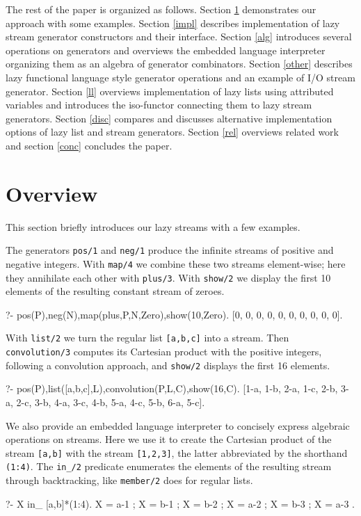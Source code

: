 \documentclass[submission,copyright,creativecommons]{eptcs}
\begin{document}
The rest of the paper is organized as follows.
Section \ref{ov} demonstrates our approach with some examples.
Section \ref{impl} describes implementation of lazy stream generator constructors and 
their  interface.
Section \ref{alg} introduces several operations on generators and overviews the
embedded language interpreter organizing them as an algebra of generator combinators.
Section \ref{other} describes lazy functional language style generator operations
and an example of I/O stream generator.
Section \ref{ll} overviews implementation of lazy lists using attributed variables
and introduces the iso-functor connecting them to  lazy stream generators.
Section \ref{disc} compares and discusses alternative implementation options of lazy list and stream generators.
Section \ref{rel} overviews related work and
section \ref{conc} concludes the paper. 

\section{Overview}\label{ov}

This section briefly introduces our lazy streams  with a few examples.

The generators {\tt pos/1} and {\tt neg/1} produce the infinite streams of positive
and negative integers. With {\tt map/4} we combine these two streams element-wise;
here they annihilate each other with {\tt plus/3}. With {\tt show/2} we display
the first 10 elements of the resulting constant stream of zeroes.
\begin{codex}
?- pos(P),neg(N),map(plus,P,N,Zero),show(10,Zero).
[0, 0, 0, 0, 0, 0, 0, 0, 0, 0].
\end{codex}
With \texttt{list/2} we turn the regular list \texttt{[a,b,c]} into a stream.
Then {\tt convolution/3} computes its Cartesian product with the positive
integers, following a convolution approach, and {\tt show/2} displays the first 16 elements. 
\begin{codex}
?- pos(P),list([a,b,c],L),convolution(P,L,C),show(16,C).
[1-a, 1-b, 2-a, 1-c, 2-b, 3-a, 2-c, 3-b, 4-a, 3-c, 4-b, 5-a, 4-c, 5-b, 6-a, 5-c].
\end{codex}
We also provide an embedded language interpreter to concisely 
express algebraic operations on streams. Here we use it to create
the Cartesian product of the stream \texttt{[a,b]} with the stream
\texttt{[1,2,3]}, the latter abbreviated by the shorthand \texttt{(1:4)}.
The \texttt{in\_/2} predicate enumerates the elements of the resulting stream
through backtracking, like \texttt{member/2} does for regular lists.
\begin{codex}
?- X in_ [a,b]*(1:4).
X = a-1 ; X = b-1 ; X = b-2 ; X = a-2 ; X = b-3 ; X = a-3 .
\end{codex}
     
\end{document}
